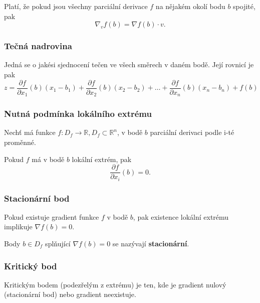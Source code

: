 \noindent Platí, že pokud jsou všechny parciální derivace $f$ na nějakém okolí bodu $b$ spojité, pak
\begin{equation}
    \nabla_v f(b) = \nabla f(b) \cdot v.
\end{equation}

\subsubsection{Tečná nadrovina}

Jedná se o jakési sjednocení tečen ve všech směrech v daném bodě. Její rovnicí je pak
\begin{equation}
    z = \frac{\partial f}{\partial x_1}(b)(x_1 - b_1) + \frac{\partial f}{\partial x_2}(b)(x_2 - b_2) + \ldots + \frac{\partial f}{\partial x_n}(b)(x_n - b_n) + f(b)
\end{equation}

\subsubsection{Nutná podmínka lokálního extrému}

Nechť má funkce $f: D_f \to \mathbb{R}, D_f \subset \mathbb{R}^n$, v bodě $b$ parciální derivaci podle i-té proměnné.

\vspace{4pt} \noindent Pokud $f$ má v bodě $b$ lokální extrém, pak
\begin{equation}
    \frac{\partial f}{\partial x_i}(b) = 0.
\end{equation}

\subsubsection{Stacionární bod}

Pokud existuje gradient funkce $f$ v bodě $b$, pak existence lokální extrému implikuje $\nabla f(b) = 0$.

\vspace{4pt} \noindent Body $b \in D_f$ splňující $\nabla f(b) = 0$ se nazývají \textbf{stacionární}.

\subsubsection{Kritický bod}

Kritickým bodem (podezřelým z extrému) je ten, kde je gradient nulový (stacionární bod) nebo gradient neexistuje.

